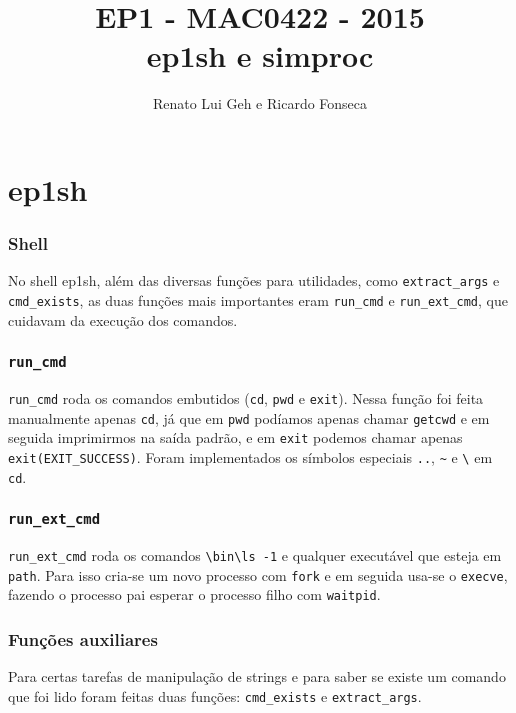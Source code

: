 \documentclass{beamer}
\title[EP1 - MAC0422]{EP1 - MAC0422 - 2015 \\
                      ep1sh e simproc} %
\author{Renato Lui Geh e Ricardo Fonseca}
\date{}
\begin{document}
\begin{frame}
  \titlepage %
\end{frame}



\section{ep1sh} %

\begin{frame}
  \frametitle{Shell}
  No shell ep1sh, além das diversas funções para utilidades, como \texttt{extract\_args} e \texttt{cmd\_exists}, as duas funções mais importantes eram \texttt{run\_cmd} e \texttt{run\_ext\_cmd}, que cuidavam
  da execução dos comandos.
\end{frame}

\begin{frame}
  \frametitle{\texttt{run\_cmd}}
  \texttt{run\_cmd} roda os comandos embutidos (\texttt{cd}, \texttt{pwd} e \texttt{exit}). Nessa função foi feita manualmente apenas \texttt{cd}, já que em \texttt{pwd} podíamos apenas chamar
  \texttt{getcwd} e em seguida imprimirmos na saída padrão, e em \texttt{exit} podemos chamar apenas \texttt{exit(EXIT\_SUCCESS)}. Foram implementados os símbolos especiais \texttt{..}, \texttt{\~} e \texttt{\textbackslash} em
  \texttt{cd}.
\end{frame}

\begin{frame}
  \frametitle{\texttt{run\_ext\_cmd}}
  \texttt{run\_ext\_cmd} roda os comandos \texttt{\textbackslash bin\textbackslash ls -1} e qualquer executável que esteja em \texttt{path}. Para isso cria-se um novo processo com \texttt{fork} e em seguida usa-se o \texttt{execve},
  fazendo o processo pai esperar o processo filho com \texttt{waitpid}.
\end{frame}


\begin{frame}
  \frametitle{Funções auxiliares}
  Para certas tarefas de manipulação de strings e para saber se existe um comando que foi lido foram feitas duas funções: \texttt{cmd\_exists} e \texttt{extract\_args}. 
\end{frame}
\end{document}
